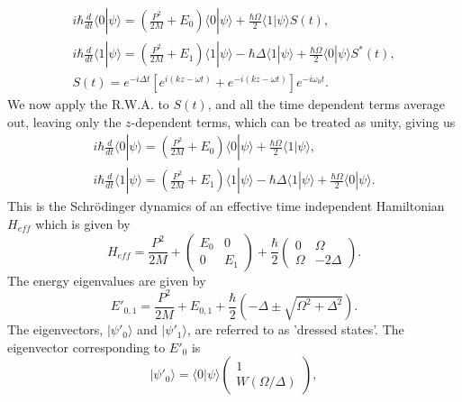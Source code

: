 \begin{eqnarray}
i\hbar \frac{d}{dt}\langle 0|\psi\rangle = \left( \frac{P^2}{2M} + E_0 \right) \langle 0|\psi\rangle + \frac{\hbar \Omega}{2} \langle 1|\psi\rangle S(t), \nonumber \\
i\hbar \frac{d}{dt}\langle 1|\psi\rangle = \left( \frac{P^2}{2M} + E_1 \right) \langle 1|\psi\rangle - \hbar \Delta \langle 1|\psi\rangle + \frac{\hbar\Omega}{2}\langle 0|\psi\rangle S^*(t), \nonumber \\
S(t)= e^{-i\Delta t} \left[ e^{i \left( kz-\omega t \right)}+  e^{-i \left( kz-\omega t \right)} \right] e^{-i\omega_0 t}.
\label{eq:2level:transformed:chapter-intro}
\end{eqnarray}
We now apply the R.W.A. to $S(t)$, and all the time dependent terms average out, leaving only the $z$-dependent terms, which can be treated as unity, giving us
\begin{eqnarray}
i\hbar \frac{d}{dt}\langle 0|\psi\rangle = \left( \frac{P^2}{2M} + E_0 \right) \langle 0|\psi\rangle + \frac{\hbar \Omega}{2} \langle 1|\psi\rangle, \nonumber \\
i\hbar \frac{d}{dt}\langle 1|\psi\rangle = \left( \frac{P^2}{2M} + E_1 \right) \langle 1|\psi\rangle - \hbar \Delta \langle 1|\psi\rangle + \frac{\hbar\Omega}{2}\langle 0|\psi\rangle.
\label{eq:2level:transformed:rwa:chapter-intro}
\end{eqnarray}
This is the Schr\"odinger dynamics of an effective time independent Hamiltonian $H_{eff}$ which is given by 
\begin{equation}
H_{eff} = \frac{P^2}{2M}+
\left( \begin{array}{cc}
E_0 & 0\\
0 & E_1
\end{array}
\right) + \frac{\hbar}{2} \left( \begin{array}{cc}
0 & \Omega \\
\Omega & -2 \Delta
\end{array}
\right).
\label{eq:3lvl:hamilt:chapter-intro}
\end{equation}
The energy eigenvalues are given by 
\begin{equation}
E'_{0,1}=\frac{P^2}{2M}+E_{0,1}+ \frac{\hbar}{2} \left( -\Delta \pm \sqrt{\Omega^2 + \Delta^2} \right).
\label{eq:diag:chapter-intro}
\end{equation}
The eigenvectors, $|\psi'_0 \rangle$ and $|\psi'_1 \rangle$, are referred to as 'dressed states'. The eigenvector corresponding to $E'_0$ is 
\begin{equation}
|\psi'_0 \rangle = \langle 0 | \psi \rangle \left( \begin{array}{c}
                                                 1 \\
						 W(\Omega/\Delta)
                                                \end{array}\right),
\end{equation}
